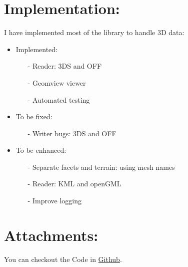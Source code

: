 \documentclass[a4paper, 11pt]{article}
\begin{document}
	\section*{Implementation:}
	I have implemented most of the library to handle 3D data:
	\begin{itemize}
		\item Implemented:
			\begin{itemize}
				\item[-] Reader: 3DS and OFF
				\item[-] Geomview viewer
				\item[-] Automated testing
			\end{itemize}
		\item To be fixed:
			\begin{itemize}
				\item[-] Writer bugs: 3DS and OFF
			\end{itemize}
		\item To be enhanced:
			\begin{itemize}
				\item[-] Separate facets and terrain: using mesh names
				\item[-] Reader: KML and openGML
				\item[-] Improve logging
			\end{itemize}
	\end{itemize}
	
	\section*{Attachments:}
	
	You can checkout the Code in \href{https://github.com/Ethiy/3DSceneModel}{Github}.
	
	
	
\end{document}
